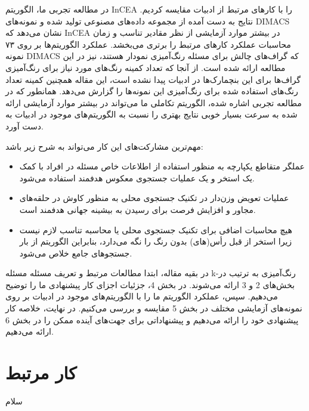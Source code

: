 \documentclass[a4paper,10pt]{article}
\begin{document}
        در مطالعه تجربی ما، الگوریتم InCEA را با کارهای مرتبط از ادبیات مقایسه کردیم. نتایج به دست آمده از مجموعه داده‌های مصنوعی تولید شده و نمونه‌های DIMACS نشان می‌دهد که InCEA در بیشتر موارد آزمایشی از نظر مقادیر تناسب و زمان محاسبات عملکرد کارهای مرتبط را برتری می‌بخشد. عملکرد الگوریتم‌ها بر روی ۷۳ نمونه DIMACS که گراف‌های چالش برای مسئله رنگ‌آمیزی نمودار هستند، نیز در این مطالعه ارائه شده است. از آنجا که تعداد کمینه رنگ‌های مورد نیاز برای رنگ‌آمیزی گراف‌ها برای این بنچمارک‌ها در ادبیات پیدا نشده است، این مقاله همچنین کمینه تعداد رنگ‌های استفاده شده برای رنگ‌آمیزی این نمونه‌ها را گزارش می‌دهد. همانطور که در مطالعه تجربی اشاره شده، الگوریتم تکاملی ما می‌تواند در بیشتر موارد آزمایشی ارائه شده به سرعت بسیار خوبی نتایج بهتری را نسبت به الگوریتم‌های موجود در ادبیات به دست آورد.

        مهم‌ترین مشارکت‌های این کار می‌تواند به شرح زیر باشد:

        \begin{itemize}
            
            \item عملگر متقاطع یکپارچه به منظور استفاده از اطلاعات خاص مسئله در افراد با کمک یک استخر و یک عملیات جستجوی معکوس هدفمند استفاده می‌شود.

            \item عملیات تعویض وزن‌دار در تکنیک جستجوی محلی به منظور کاوش در حلقه‌های مجاور و افزایش فرصت برای رسیدن به بیشینه جهانی هدفمند است.

            \item هیچ محاسبات اضافی برای تکنیک جستجوی محلی یا محاسبه تناسب لازم نیست زیرا استخر از قبل رأس(های) بدون رنگ را نگه می‌دارد، بنابراین الگوریتم از بار جستجوهای جامع خلاص می‌شود.

        \end{itemize}

        در بقیه مقاله، ابتدا مطالعات مرتبط و تعریف مسئله مسئله k-رنگ‌آمیزی به ترتیب در بخش‌های 2 و 3 ارائه می‌شوند. در بخش 4، جزئیات اجزای کار پیشنهادی ما را توضیح می‌دهیم. سپس، عملکرد الگوریتم ما را با الگوریتم‌های موجود در ادبیات بر روی نمونه‌های آزمایشی مختلف در بخش 5 مقایسه و بررسی می‌کنیم. در نهایت، خلاصه کار پیشنهادی خود را ارائه می‌دهیم و پیشنهاداتی برای جهت‌های آینده ممکن را در بخش 6 ارائه می‌دهیم.

    \section{کار مرتبط}

        سلام
\end{document}
